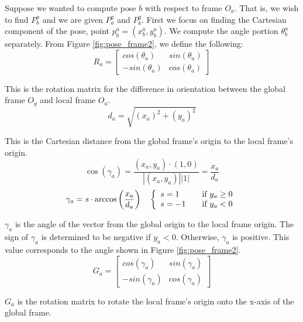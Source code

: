 Suppose we wanted to compute pose $b$ with respect to frame $O_a$.  That is, we wish to find $P_b^a$ and we are given $P_a^g$ and $P_b^g$.  First we focus on finding the Cartesian component of the pose, point $p_b^a = (x_b^a, y_b^a)$.  We compute the angle portion $\theta_b^a$ separately.  From Figure \ref{fig:pose_frame2}, we define the following:
\begin{equation}
\label{equ:coord1}
R_a =
\begin{bmatrix}
cos(\theta_a) & sin(\theta_a) \\
-sin(\theta_a) & cos(\theta_a)
\end{bmatrix}
\end{equation}

This is the rotation matrix for the difference in orientation between the global frame $O_g$ and local frame $O_a$.
\begin{equation}
\label{equ:coord2}
d_a = \sqrt{(x_a)^2 + (y_a)^2} 
\end{equation}

This is the Cartesian distance from the global frame's origin to the local frame's origin.
\begin{equation}
\cos(\gamma_a) = \frac{(x_a,y_a) \cdot (1,0)}{|(x_a, y_a)| |1|} = \frac{x_a}{d_a} 
\end{equation}
\begin{equation}
\label{equ:coord3}
\gamma_a = s \cdot \arccos \left( \frac{x_a}{d_a} \right) 
\quad
\left\{ 
  \begin{array}{l l}
    s = 1 & \quad \text{if $y_a \geq 0$}\\
    s = -1 & \quad \text{if $y_a < 0$}
  \end{array} \right.
\end{equation}

$\gamma_a$ is the angle of the vector from the global origin to the local frame origin.  The sign of $\gamma_a$ is determined to be negative if $y_a < 0$.  Otherwise, $\gamma_a$ is positive.  This value corresponds to the angle shown in Figure \ref{fig:pose_frame2}.
\begin{equation}
\label{equ:coord4}
G_a = 
\begin{bmatrix}
cos(\gamma_a) & sin(\gamma_a) \\
-sin(\gamma_a) & cos(\gamma_a)
\end{bmatrix}
\end{equation}

$G_a$ is the rotation matrix to rotate the local frame's origin onto the x-axis of the global frame.

